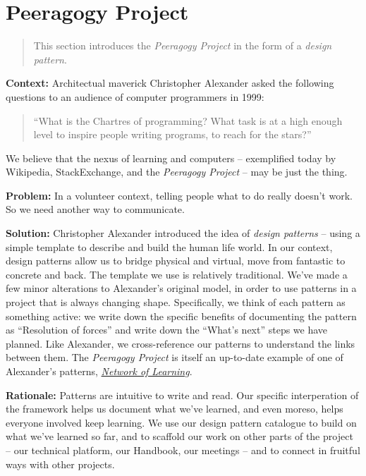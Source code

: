 \section{Peeragogy Project}

\begin{quote}
This section introduces the \emph{Peeragogy Project} in the form of a \emph{design pattern}.
\end{quote}

\textbf{Context:}  Architectual maverick Christopher Alexander asked the following questions to an audience of computer programmers in 1999: 
\begin{quote}
``What is the Chartres of programming? What task is at a high enough level to inspire people writing programs, to reach for the stars?''
\end{quote}
We believe that the nexus of learning and computers -- exemplified today by Wikipedia, StackExchange, and the \emph{Peeragogy Project} -- may be just the thing.

\textbf{Problem:} In a volunteer context, telling people what to do really doesn't work.  So we need another way to communicate.

\textbf{Solution:} Christopher Alexander introduced the idea of \emph{design patterns} -- using a simple template to describe and build the human life world.  In our context, design patterns allow us to bridge physical and virtual, move from fantastic to concrete and back.  The template we use is relatively traditional.  We've made a few minor alterations to Alexander's original model, in order to use patterns in a project that is always changing shape.  Specifically, we think of each pattern as something active: we write down the specific benefits of documenting the pattern as ``Resolution of forces'' and write down the ``What's next'' steps we have planned.  Like Alexander, we cross-reference our patterns to understand the links between them.  The \emph{Peeragogy Project} is itself an up-to-date example of one of Alexander's patterns, \href{http://en.wikipedia.org/wiki/Networked_learning#1970s}{\emph{Network of Learning}}.

\textbf{Rationale:}
Patterns are intuitive to write and read.  Our specific interperation of the framework helps us document what we've learned, and even moreso, helps everyone involved keep learning.  We use our design pattern catalogue to build on what we've learned so far, and to scaffold our work on other parts of the project -- our technical platform, our Handbook, our meetings -- and to connect in fruitful ways with other projects.  

